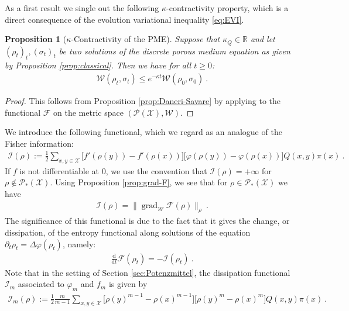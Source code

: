 \documentclass[a4paper,11pt,reqno]{amsart}
\theoremstyle{plain}
\newtheorem{proposition}[theorem]{Proposition}
\theoremstyle{remark}
\numberwithin{equation}{section}
\begin{document}
As a first result we single out the following $\kappa$-contractivity
property, which is a direct consequence of the evolution variational
inequality \eqref{eq:EVI}.

\begin{proposition}[$\kappa$-Contractivity of the PME]\label{prop:contractivity}
  Suppose that $\kappa_Q \in {{\mathbb R}}$ and let $(\rho_t)_{t},
  (\sigma_t)_{t}$ be two solutions of the discrete porous medium
  equation as given by Proposition \ref{prop:classical}.  Then we have
  for all $t\geq0$:
\begin{align*}
 {\mathcal{W}}(\rho_t, \sigma_t) \leq e^{-\kappa t} {\mathcal{W}}(\rho_0, \sigma_0)\ .
\end{align*}
\end{proposition}

\begin{proof}
  This follows from Proposition \ref{prop:Daneri-Savare} by applying
  \cite[Proposition 3.1]{DS08} to the functional ${\mathcal{F}}$ on the metric
  space $({{\mathscr{P}}({\mathcal{X}})},{\mathcal{W}})$.
\end{proof}

We introduce the following functional, which we regard as an analogue
of the Fisher information:
\begin{align*}
  {\mathcal{I}}(\rho) := \frac12\sum_{x,y\in {\mathcal{X}}}\big[f'(\rho(y))-f'(\rho(x))\big]\big[{\varphi}(\rho(y))-{\varphi}(\rho(x))\big]Q(x,y)\pi(x)\ .
\end{align*}
If $f$ is not differentiable at $0$, we use the convention that
${\mathcal{I}}(\rho)=+\infty$ for $\rho\notin{\mathscr{P}}_*({\mathcal{X}})$. Using Proposition
\ref{prop:grad-F}, we see that for $\rho\in{\mathscr{P}}_*({\mathcal{X}})$ we have
\begin{align*}
  {\mathcal{I}}(\rho) = \| \operatorname{grad}_{\mathcal{W}}{\mathcal{F}}(\rho) \|_\rho\ .
\end{align*}
The significance of this functional is due to the fact that it gives
the change, or dissipation, of the entropy functional along solutions
of the equation $\partial_t\rho_t=\Delta{\varphi}(\rho_t)$, namely:
\begin{align*}
  {\frac{\mathrm{d}}{\mathrm{d}t}}{\mathcal{F}}(\rho_t) = -{\mathcal{I}}(\rho_t)\ .
\end{align*}
Note that in the setting of Section \ref{sec:Potenzmittel}, the
dissipation functional ${\mathcal{I}}_m$ associated to ${\varphi}_m$ and $f_m$ is
given by
\begin{align*}
  {\mathcal{I}}_m(\rho) := \frac12\frac{m}{m-1}\sum\limits_{x, y\in {\mathcal{X}}}\big[\rho(y)^{m-1}-\rho(x)^{m-1}\big]\big[\rho(y)^m-\rho(x)^m\big]Q(x,y)\pi(x)\ .
\end{align*}
\end{document}
